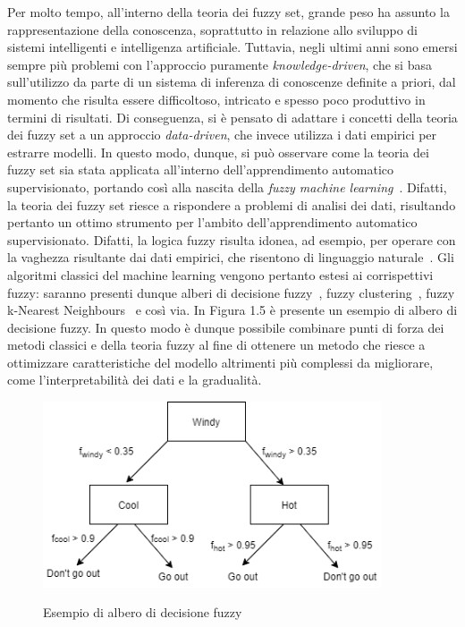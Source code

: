 \documentclass[11pt,  oneside, openany]{book}
\begin{document}
Per molto tempo, all'interno della teoria dei fuzzy set, grande peso ha assunto la rappresentazione della conoscenza, soprattutto in relazione allo sviluppo di sistemi intelligenti e intelligenza artificiale. Tuttavia, negli ultimi anni sono emersi sempre più problemi con l'approccio puramente \textit{knowledge-driven}, che si basa sull'utilizzo da parte di un sistema di inferenza di conoscenze definite a priori, dal momento che risulta essere difficoltoso, intricato e spesso poco produttivo in termini di risultati. Di conseguenza, si è pensato di adattare i concetti della teoria dei fuzzy set a un approccio \textit{data-driven}, che invece utilizza i dati empirici per estrarre modelli. In questo modo, dunque, si può osservare come la teoria dei fuzzy set sia stata applicata all'interno dell'apprendimento automatico supervisionato, portando così alla nascita della \textit{fuzzy machine learning}~\cite{fuzzyml}. Difatti, la teoria dei fuzzy set riesce a rispondere a problemi di analisi dei dati, risultando pertanto un ottimo strumento per l'ambito dell'apprendimento automatico supervisionato. Difatti, la logica fuzzy risulta idonea, ad esempio, per operare con la vaghezza risultante dai dati empirici, che risentono di linguaggio naturale~\cite{fuzzydata}. 
Gli algoritmi classici del machine learning vengono pertanto estesi ai corrispettivi fuzzy: saranno presenti dunque alberi di decisione fuzzy~\cite{fuzzydectree}, fuzzy clustering~\cite{fcm-intro}, fuzzy k-Nearest Neighbours~\cite{fknn-example1} e così via. In Figura 1.5 è presente un esempio di albero di decisione fuzzy. In questo modo è dunque possibile combinare punti di forza dei metodi classici e della teoria fuzzy al fine di ottenere un metodo che riesce a ottimizzare caratteristiche del modello altrimenti più complessi da migliorare, come l'interpretabilità dei dati e la gradualità. 

\begin{figure}[h!]
\begin{center}
  \includegraphics[width=10cm]{Immagini/fuzzyTreeDecis.png}\\
  \caption{Esempio di albero di decisione fuzzy}
\end{center}
\end{figure}
\end{document}
